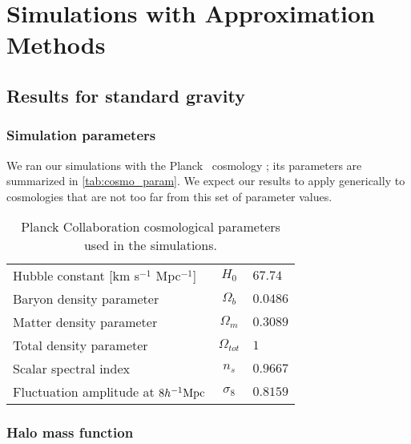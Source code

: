 \chapter{Simulations with Approximation Methods}
\label{chpt:app_sims}

\section{Results for standard gravity}

\subsection{Simulation parameters}
We ran our simulations with the Planck \LCDM\ cosmology \parencite{planck_cosm}; its parameters are summarized in \autoref{tab:cosmo_param}. We expect our results to apply generically to cosmologies that are not too far from this set of parameter values.

\begin{table}
\begin{tabular}{ l c l }
  \hline \hline
  Hubble constant  [km s$^{-1}$ Mpc$^{-1}$] & $H_0$ & $67.74$ \\
  Baryon density parameter & $\Omega_b$ & $0.0486$ \\
  Matter density parameter & $\Omega_m$ & $0.3089$ \\
  Total density parameter & $\Omega_{tot}$ & $1$ \\
  Scalar spectral index & $n_s$ & $0.9667$ \\
  Fluctuation amplitude at $8h^{-1}\text{Mpc}$ & $\sigma_8$ & $0.8159$ \\
  \hline \hline
\end{tabular}
\caption{Planck Collaboration cosmological parameters \parencite{planck_cosm} used in the simulations.}
\label{tab:cosmo_param}
\end{table}







\subsection{Halo mass function}


